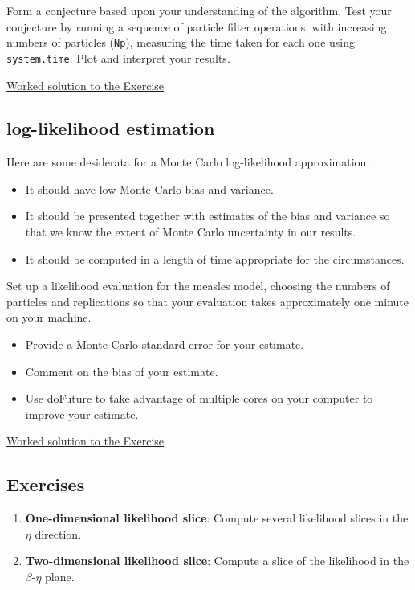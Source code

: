 \documentclass[
  letterpaper,
  DIV=11,
  numbers=noendperiod]{scrartcl}
\providecommand{\tightlist}{%
  \setlength{\itemsep}{0pt}\setlength{\parskip}{0pt}}\usepackage{longtable,booktabs,array}
\begin{document}
Form a conjecture based upon your understanding of the algorithm. Test
your conjecture by running a sequence of particle filter operations,
with increasing numbers of particles (\texttt{Np}), measuring the time
taken for each one using \texttt{system.time}. Plot and interpret your
results.

\vfill

\href{./expense.html}{Worked solution to the Exercise}

\hypertarget{log-likelihood-estimation}{%
\subsection{log-likelihood estimation}\label{log-likelihood-estimation}}

Here are some desiderata for a Monte Carlo log-likelihood approximation:

\begin{itemize}
\tightlist
\item
  It should have low Monte Carlo bias and variance.
\item
  It should be presented together with estimates of the bias and
  variance so that we know the extent of Monte Carlo uncertainty in our
  results.
\item
  It should be computed in a length of time appropriate for the
  circumstances.
\end{itemize}

Set up a likelihood evaluation for the measles model, choosing the
numbers of particles and replications so that your evaluation takes
approximately one minute on your machine.

\begin{itemize}
\tightlist
\item
  Provide a Monte Carlo standard error for your estimate.
\item
  Comment on the bias of your estimate.
\item
  Use doFuture to take advantage of multiple cores on your computer to
  improve your estimate.
\end{itemize}

\href{./loglikest.html}{Worked solution to the Exercise}

\hypertarget{exercises-1}{%
\subsection{Exercises}\label{exercises-1}}

\begin{enumerate}
\def\labelenumi{\arabic{enumi}.}
\item
  \textbf{One-dimensional likelihood slice}: Compute several likelihood
  slices in the \(\eta\) direction.
\item
  \textbf{Two-dimensional likelihood slice}: Compute a slice of the
  likelihood in the \(\beta\)-\(\eta\) plane.
\end{enumerate}
\end{document}
